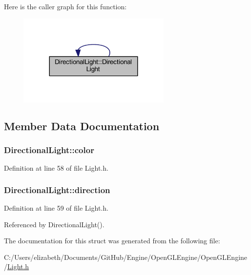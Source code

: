 Here is the caller graph for this function\+:\nopagebreak
\begin{figure}[H]
\begin{center}
\leavevmode
\includegraphics[width=215pt]{struct_directional_light_ac2b1a62d9ad6395b2f453b4544127bf1_icgraph}
\end{center}
\end{figure}




\subsection{Member Data Documentation}
\subsubsection[{\texorpdfstring{color}{color}}]{ Directional\+Light\+::color}\hypertarget{struct_directional_light_a0fff081764e57e46c7342fc6c6849c1c}{}\label{struct_directional_light_a0fff081764e57e46c7342fc6c6849c1c}


Definition at line 58 of file Light.\+h.

\subsubsection[{\texorpdfstring{direction}{direction}}]{ Directional\+Light\+::direction}\hypertarget{struct_directional_light_a78a56aede026b50aa2606bf20c1b0871}{}\label{struct_directional_light_a78a56aede026b50aa2606bf20c1b0871}


Definition at line 59 of file Light.\+h.



Referenced by Directional\+Light().



The documentation for this struct was generated from the following file\+:\begin{DoxyCompactItemize}
\item 
C\+:/\+Users/elizabeth/\+Documents/\+Git\+Hub/\+Engine/\+Open\+G\+L\+Engine/\+Open\+G\+L\+Engine/\hyperlink{_light_8h}{Light.\+h}\end{DoxyCompactItemize}
